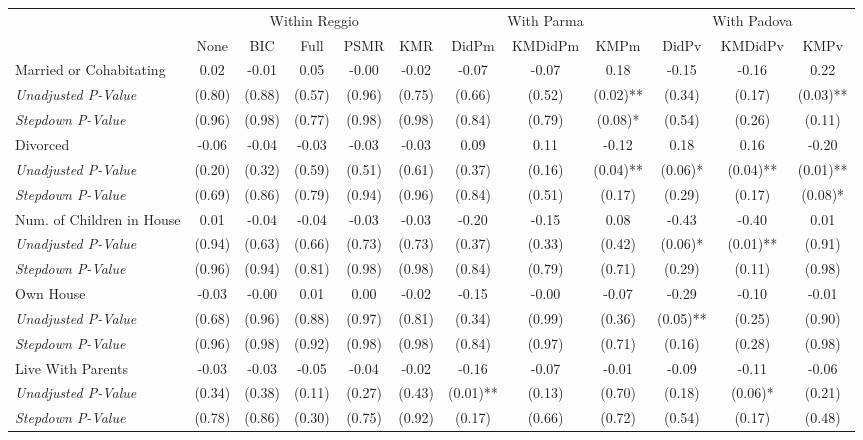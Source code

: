 \begin{tabular}{l c c c c c c c c c c c}
\toprule
& \multicolumn{5}{c}{Within Reggio} & \multicolumn{3}{c}{With Parma} & \multicolumn{3}{c}{With Padova} \\\cmidrule(lr){2-6} \cmidrule(lr){7-9} \cmidrule(lr){10-12}
 & None & BIC & Full & PSMR & KMR & DidPm & KMDidPm & KMPm & DidPv & KMDidPv & KMPv \\
\midrule
Married or Cohabitating & 0.02 & -0.01 & 0.05 & -0.00 & -0.02 & -0.07 & -0.07 & 0.18 & -0.15 & -0.16 & 0.22 \\
\quad \textit{Unadjusted P-Value} & (0.80) & (0.88) & (0.57) & (0.96) & (0.75) & (0.66) & (0.52) & (0.02)** & (0.34) & (0.17) & (0.03)** \\
\quad \textit{Stepdown P-Value} & (0.96) & (0.98) & (0.77) & (0.98) & (0.98) & (0.84) & (0.79) & (0.08)* & (0.54) & (0.26) & (0.11) \\
Divorced & -0.06 & -0.04 & -0.03 & -0.03 & -0.03 & 0.09 & 0.11 & -0.12 & 0.18 & 0.16 & -0.20 \\
\quad \textit{Unadjusted P-Value} & (0.20) & (0.32) & (0.59) & (0.51) & (0.61) & (0.37) & (0.16) & (0.04)** & (0.06)* & (0.04)** & (0.01)** \\
\quad \textit{Stepdown P-Value} & (0.69) & (0.86) & (0.79) & (0.94) & (0.96) & (0.84) & (0.51) & (0.17) & (0.29) & (0.17) & (0.08)* \\
Num. of Children in House & 0.01 & -0.04 & -0.04 & -0.03 & -0.03 & -0.20 & -0.15 & 0.08 & -0.43 & -0.40 & 0.01 \\
\quad \textit{Unadjusted P-Value} & (0.94) & (0.63) & (0.66) & (0.73) & (0.73) & (0.37) & (0.33) & (0.42) & (0.06)* & (0.01)** & (0.91) \\
\quad \textit{Stepdown P-Value} & (0.96) & (0.94) & (0.81) & (0.98) & (0.98) & (0.84) & (0.79) & (0.71) & (0.29) & (0.11) & (0.98) \\
Own House & -0.03 & -0.00 & 0.01 & 0.00 & -0.02 & -0.15 & -0.00 & -0.07 & -0.29 & -0.10 & -0.01 \\
\quad \textit{Unadjusted P-Value} & (0.68) & (0.96) & (0.88) & (0.97) & (0.81) & (0.34) & (0.99) & (0.36) & (0.05)** & (0.25) & (0.90) \\
\quad \textit{Stepdown P-Value} & (0.96) & (0.98) & (0.92) & (0.98) & (0.98) & (0.84) & (0.97) & (0.71) & (0.16) & (0.28) & (0.98) \\
Live With Parents & -0.03 & -0.03 & -0.05 & -0.04 & -0.02 & -0.16 & -0.07 & -0.01 & -0.09 & -0.11 & -0.06 \\
\quad \textit{Unadjusted P-Value} & (0.34) & (0.38) & (0.11) & (0.27) & (0.43) & (0.01)** & (0.13) & (0.70) & (0.18) & (0.06)* & (0.21) \\
\quad \textit{Stepdown P-Value} & (0.78) & (0.86) & (0.30) & (0.75) & (0.92) & (0.17) & (0.66) & (0.72) & (0.54) & (0.17) & (0.48) \\
\bottomrule
\end{tabular}
